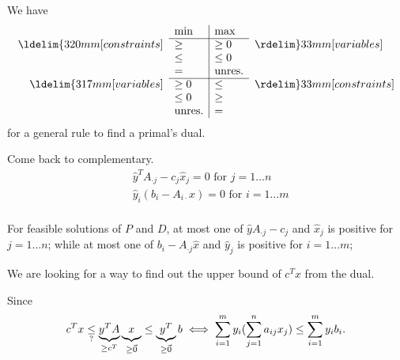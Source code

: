 \begin{note}
	We have
	\[
		\begin{array}{rl|ll}

			                                & \min          & \max          &                                \\
			\cline{2-3}
			\ldelim\{{3}{20mm}[constraints] & \geq          & \geq 0        & \rdelim\}{3}{3mm}[variables]   \\
			                                & \leq          & \leq 0        &                                \\
			                                & =             & \mbox{unres.} &                                \\
			\cline{2-3}
			\ldelim\{{3}{17mm}[variables]   & \geq 0        & \leq          & \rdelim\}{3}{3mm}[constraints] \\
			                                & \leq 0        & \geq          &                                \\
			                                & \mbox{unres.} & =             &                                \\
		\end{array}
	\]
	for a general rule to find a primal's dual.
\end{note}

Come back to complementary.
\[
	\begin{split}
		&\hat{y}^{T} A_{\cdot j} - c_{j}\hat{x}_j = 0\text{ for }j = 1\ldots n\\
		&\hat{y}_i(b_{i} - A_{i\cdot }x) = 0\text{ for }i = 1\ldots m\\
	\end{split}
\]

\begin{note}
	For feasible solutions of \(P\) and \(D\), at most one of \(\hat{y}A_{\cdot j} - c_{j}\) and \(\hat{x}_j\) is positive for \(j = 1\ldots n\);
	while at most one of \(b_{i} - A_{\cdot j}\hat{x}\) and \(\hat{y}_j\) is positive for \(i = 1\ldots m\);
\end{note}

\begin{problem}
We are looking for a way to find out the upper bound of \(c^{T}x\) from the dual.
\end{problem}
Since
\[
	c^{T}x \underset{?}{\leq} \underbrace{y^{T} A }_{\geq c^{T}}\underbrace{\vphantom{y^{T}A}x}_{\geq \vec{0}} \leq \underbrace{y^{T}}_{\geq  \vec{0}}b\iff \sum\limits_{i=1}^{m} y_{i}(\sum\limits_{j=1}^{n} a_{ij}x_{j})\leq \sum\limits_{i=1}^{m} y_{i}b_{i}.
\]


